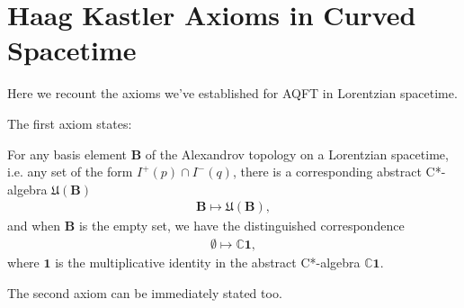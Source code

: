 \section{Haag Kastler Axioms in Curved Spacetime}\label{sctn:haag-kastler-axioms-in-curved-spacetime}
Here we recount the axioms we've established for AQFT in Lorentzian spacetime.

The first axiom states:

\begin{definition}
    \label{def:local-algebras-in-curved-spacetime}
    \leanok
    For any basis element $\mathbf{B}$ of the Alexandrov topology on a Lorentzian spacetime, i.e. any set of the form $I^+(p) \cap I^-(q)$, there is a corresponding abstract C*-algebra $\mathfrak{U}(\mathbf{B})$
    \begin{align}
        \mathbf{B} \longmapsto \mathfrak{U}(\mathbf{B}),
    \end{align}
    and when $\mathbf{B}$ is the empty set, we have the distinguished correspondence
    \begin{align}
        \emptyset \longmapsto \mathbb{C} \mathbf{1},
    \end{align}
    where $\mathbf{1}$ is the multiplicative identity in the abstract C*-algebra $\mathbb{C} \mathbf{1}$.
\end{definition}

The second axiom can be immediately stated too.

